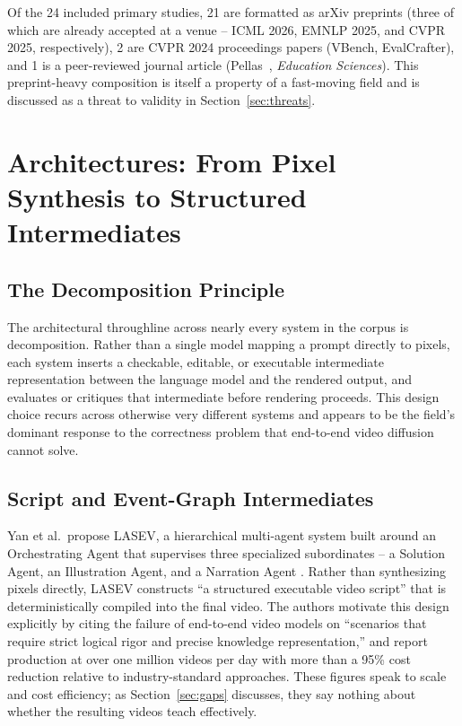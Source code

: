 \documentclass[journal]{IEEEtran}
\begin{document}
Of the 24 included primary studies, 21 are formatted as arXiv preprints (three of which are already accepted at a venue -- ICML 2026, EMNLP 2025, and CVPR 2025, respectively), 2 are CVPR 2024 proceedings papers (VBench, EvalCrafter), and 1 is a peer-reviewed journal article (Pellas~\cite{pellas2025aivideos}, \emph{Education Sciences}). This preprint-heavy composition is itself a property of a fast-moving field and is discussed as a threat to validity in Section~\ref{sec:threats}.

\section{Architectures: From Pixel Synthesis to Structured Intermediates}
\label{sec:architectures}

\subsection{The Decomposition Principle}

The architectural throughline across nearly every system in the corpus is decomposition. Rather than a single model mapping a prompt directly to pixels, each system inserts a checkable, editable, or executable intermediate representation between the language model and the rendered output, and evaluates or critiques that intermediate before rendering proceeds. This design choice recurs across otherwise very different systems and appears to be the field's dominant response to the correctness problem that end-to-end video diffusion cannot solve.

\subsection{Script and Event-Graph Intermediates}

Yan et al.\ propose LASEV, a hierarchical multi-agent system built around an Orchestrating Agent that supervises three specialized subordinates -- a Solution Agent, an Illustration Agent, and a Narration Agent \cite{yan2026lasev}. Rather than synthesizing pixels directly, LASEV constructs ``a structured executable video script'' that is deterministically compiled into the final video. The authors motivate this design explicitly by citing the failure of end-to-end video models on ``scenarios that require strict logical rigor and precise knowledge representation,'' and report production at over one million videos per day with more than a 95\% cost reduction relative to industry-standard approaches. These figures speak to scale and cost efficiency; as Section~\ref{sec:gaps} discusses, they say nothing about whether the resulting videos teach effectively.
\end{document}
